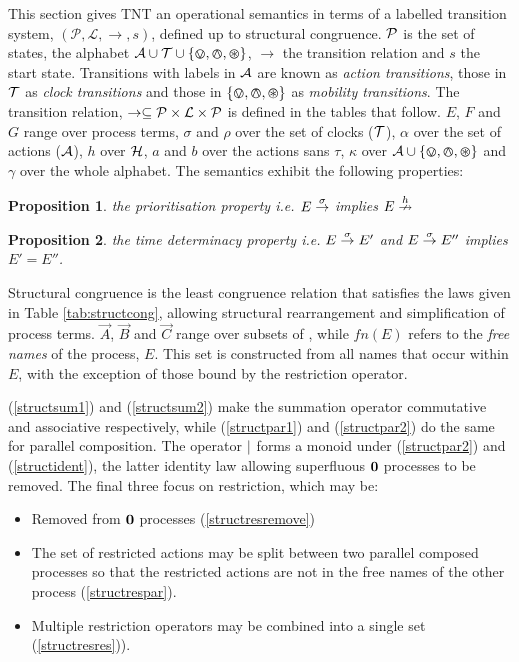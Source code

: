 \documentclass[orivec]{llncs}
\newtheorem{prop}{Proposition}
\begin{document}
This section gives TNT an operational semantics in terms of a labelled
transition system, $(\mathcal{P}, \mathcal{L}, \rightarrow, s)$, defined
up to structural congruence.  $\text{$\mathcal{P}$}$ is the set of states,  the
alphabet $\text{$\mathcal{A}$} \cup \text{$\mathcal{T}$} \cup \text{$\{ \varovee, \varowedge , \varoast\}$}$, $\rightarrow$ the
transition relation and $s$ the start state.  Transitions with labels in
$\text{$\mathcal{A}$}$ are known as \emph{action transitions}, those in $\text{$\mathcal{T}$}$ as
\emph{clock transitions} and those in $\text{$\{ \varovee, \varowedge , \varoast\}$}$ as \emph{mobility
transitions}.  The transition relation, $\rightarrow \subseteq
\text{$\mathcal{P}$} \times \text{$\mathcal{L}$} \times \text{$\mathcal{P}$}$ is defined in the tables that follow.
$E$, $F$ and $G$ range over process terms, $\sigma$ and $\rho$ over the
set of clocks ($\text{$\mathcal{T}$}$), $\alpha$ over the set of actions
($\text{$\mathcal{A}$}$), $h$ over $\text{$\mathcal{H}$}$, $a$ and $b$ over the actions
sans $\tau$, $\kappa$ over $\text{$\mathcal{A}$} \cup \text{$\{ \varovee, \varowedge , \varoast\}$}$
and $\gamma$ over the whole alphabet.  The semantics exhibit the
following properties:
\begin{prop}
the prioritisation property
i.e. $E \stackrel{\sigma}{\rightarrow}$ implies $E \stackrel{h}{\nrightarrow}$ 
\end{prop}
\begin{prop}
the time determinacy property i.e. $E \stackrel{\sigma}{\rightarrow} E'$ and $E
\stackrel{\sigma}{\rightarrow} E''$ implies $E' = E''$.
\end{prop}
Structural congruence is the least congruence relation that satisfies
the laws given in Table \ref{tab:structcong}, allowing structural
rearrangement and simplification of process terms. $\vec{A}$, $\vec{B}$
and $\vec{C}$ range over subsets of \actions, while $fn(E)$ refers to
the \emph{free names} of the process, $E$.  This set is constructed from
all names that occur within $E$, with the exception of those bound by
the restriction operator.

\textsf{(\ref{structsum1})} and \textsf{(\ref{structsum2})} make the
summation operator commutative and associative respectively, while
\textsf{(\ref{structpar1})} and \textsf{(\ref{structpar2})} do the same
for parallel composition.  The operator $\mid$ forms a monoid under
\textsf{(\ref{structpar2})} and \textsf{(\ref{structident})}, the latter
identity law allowing superfluous $\textbf{0}$ processes to be removed.  The
final three focus on restriction, which may be:

\begin{itemize}
\item Removed from $\textbf{0}$ processes \textsf{(\ref{structresremove})}
\item The set of restricted actions may be split between two parallel
      composed processes so that the restricted actions are not in the
      free names of the other process \textsf{(\ref{structrespar})}.
\item Multiple restriction operators may be combined into a single set
      \textsf{(\ref{structresres}))}.
\end{itemize}
\end{document}
